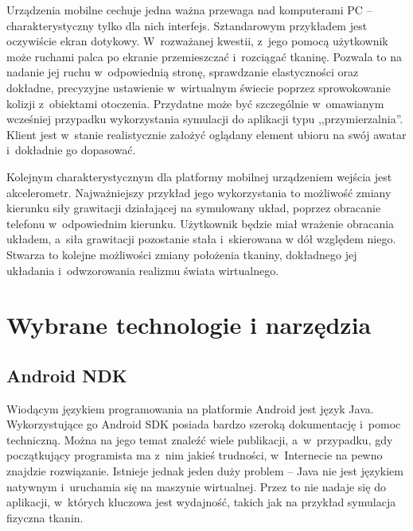 		
		Urządzenia mobilne cechuje jedna ważna przewaga nad komputerami PC -- charakterystyczny tylko dla nich interfejs. Sztandarowym przykładem jest oczywiście ekran dotykowy. W~rozważanej kwestii, z~jego pomocą użytkownik może ruchami palca po ekranie przemieszczać i~rozciągać tkaninę. Pozwala to na nadanie jej ruchu w~odpowiednią stronę, sprawdzanie elastyczności oraz dokładne, precyzyjne ustawienie w~wirtualnym świecie poprzez sprowokowanie kolizji z~obiektami otoczenia. Przydatne może być szczególnie w~omawianym wcześniej przypadku wykorzystania symulacji do aplikacji typu ,,przymierzalnia''. Klient jest w~stanie realistycznie założyć oglądany element ubioru na swój awatar i~dokładnie go dopasować. 
		
		Kolejnym charakterystycznym dla platformy mobilnej urządzeniem wejścia jest akcelerometr. Najważniejszy przykład jego wykorzystania to możliwość zmiany kierunku siły grawitacji działającej na symulowany układ, poprzez obracanie telefonu w~odpowiednim kierunku. Użytkownik będzie miał wrażenie obracania układem, a~siła grawitacji pozostanie stała i~skierowana w dół względem niego. Stwarza to kolejne możliwości zmiany położenia tkaniny, dokładnego jej układania i~odwzorowania realizmu świata wirtualnego.

	
	\section{Wybrane technologie i narzędzia}
	\label{t:technologie:narzedzia}
	
		\subsection{Android NDK}
		\label{t:technologie:narzedzia:ndk}
		
		
		Wiodącym językiem programowania na platformie Android jest język Java. Wykorzystujące go Android SDK posiada bardzo szeroką dokumentację i~pomoc techniczną. Można na jego temat znaleźć wiele publikacji, a~w~przypadku, gdy początkujący programista ma z~nim jakieś trudności, w~Internecie na pewno znajdzie rozwiązanie. Istnieje jednak jeden duży problem -- Java nie jest językiem natywnym i~uruchamia się na maszynie wirtualnej. Przez to nie nadaje się do aplikacji, w~których kluczowa jest wydajność, takich jak na przykład symulacja fizyczna tkanin.
		
